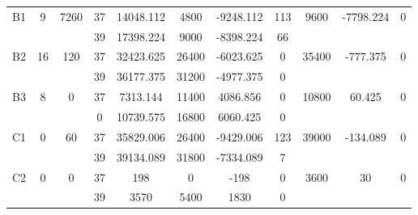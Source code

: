 \begin{sidewaystable}
\begin{tabular}{c||c|c||c|c|c|c|c||c|c|c}
         &
        
      \\
      \hline
      \multirow{2}{*}{B1} &
      \multirow{2}{*}{9} &
      \multirow{2}{*}{7260} &
      37 &
      14048.112 &
      4800 &
        -9248.112 &
        113 &
      \multirow{2}{*}{9600} &
        \multirow{2}{*}{-7798.224} &
        \multirow{2}{*}{0}
      \\
      \cline{4-8}
       &
       &
       &
      39 &
      17398.224 &
      9000 &
        -8398.224 &
        66 &
      
         &
        
      \\
      \hline
      \multirow{2}{*}{B2} &
      \multirow{2}{*}{16} &
      \multirow{2}{*}{120} &
      37 &
      32423.625 &
      26400 &
        -6023.625 &
        0 &
      \multirow{2}{*}{35400} &
        \multirow{2}{*}{-777.375} &
        \multirow{2}{*}{0}
      \\
      \cline{4-8}
       &
       &
       &
      39 &
      36177.375 &
      31200 &
        -4977.375 &
        0 &
      
         &
        
      \\
      \hline
      \multirow{2}{*}{B3} &
      \multirow{2}{*}{8} &
      \multirow{2}{*}{0} &
      37 &
      7313.144 &
      11400 &
        4086.856 &
        0 &
      \multirow{2}{*}{10800} &
        \multirow{2}{*}{60.425} &
        \multirow{2}{*}{0}
      \\
      \cline{4-8}
       &
       &
       &
      0 &
      10739.575 &
      16800 &
        6060.425 &
        0 &
      
         &
        
      \\
      \hline
      \multirow{2}{*}{C1} &
      \multirow{2}{*}{0} &
      \multirow{2}{*}{60} &
      37 &
      35829.006 &
      26400 &
        -9429.006 &
        123 &
      \multirow{2}{*}{39000} &
        \multirow{2}{*}{-134.089} &
        \multirow{2}{*}{0}
      \\
      \cline{4-8}
       &
       &
       &
      39 &
      39134.089 &
      31800 &
        -7334.089 &
        7 &
      
         &
        
      \\
      \hline
      \multirow{2}{*}{C2} &
      \multirow{2}{*}{0} &
      \multirow{2}{*}{0} &
      37 &
      198 &
      0 &
        -198 &
        0 &
      \multirow{2}{*}{3600} &
        \multirow{2}{*}{30} &
        \multirow{2}{*}{0}
      \\
      \cline{4-8}
       &
       &
       &
      39 &
      3570 &
      5400 &
        1830 &
        0 &
      

\end{tabular}
\end{sidewaystable}
